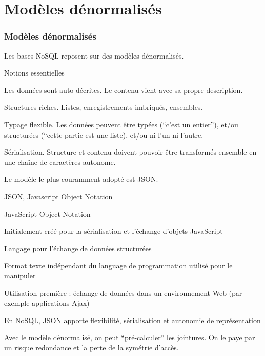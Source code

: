 


\section{Modèles dénormalisés}

\begin{frame}
\frametitle{Modèles dénormalisés}

Les bases NoSQL reposent sur des modèles \alert{dénormalisés}.

\vfill

\alert{Notions essentielles}

\begin{redbullet}
  \item \alert{Les données sont auto-décrites.} Le contenu vient avec sa propre
  description.
  
 \item \alert{Structures riches.} Listes,
 enregistrements imbriqués, ensembles.

  \item \alert{Typage flexible.} Les données peuvent être typées (``c'est un entier''),
  et/ou structurées (``cette partie est une liste), et/ou ni l'un ni
  l'autre. 
  
   \item \alert{Sérialisation.} Structure \alert{et} contenu doivent pouvoir être transformés
      ensemble en une chaîne de caractères autonome.
\end{redbullet}

\vfill

Le modèle le plus couramment adopté est JSON.
\end{frame}



\begin{frame}{JSON, Javascript Object Notation}

\begin{redbullet}
\item JavaScript Object Notation
\item Initialement créé pour la sérialisation et l'échange d'objets JavaScript
\item Langage pour l'échange de données structurées 
\item Format texte indépendant du language de programmation utilisé pour le manipuler
\end{redbullet}

\vfill 

Utilisation première : échange de données dans un environnement Web (par exemple applications Ajax)\\

\vfill

En NoSQL, JSON apporte flexibilité,  sérialisation et \alert{autonomie}
de représentation

\vfill
\begin{noteblock}
Avec le modèle dénormalisé, on peut ``pré-calculer'' les jointures. 
On le paye par un risque redondance et la perte de la symétrie d'accès.
\end{noteblock}
\end{frame}

